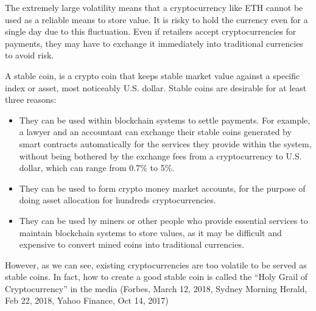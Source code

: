 \documentclass[draft, noinfoline]{ectaart}
\numberwithin{equation}{section}
\theoremstyle{plain}
\begin{document}
The extremely large volatility means that a cryptocurrency like ETH cannot be used as a reliable means to store value. It is risky to hold the currency even for a single day due to this fluctuation. Even if retailers accept cryptocurrencies for payments, they may have to exchange it immediately into traditional currencies to avoid risk.



A stable coin, is a crypto coin that keeps stable market value against a specific index or asset, most noticeably U.S. dollar. Stable coins are desirable for at least three reasons:
\begin{itemize}
\item They can be used within blockchain systems to settle payments. For example, a lawyer and an accountant can exchange their stable coins generated by smart contracts automatically for the services they provide within the system, without being bothered by the exchange fees from a cryptocurrency to U.S. dollar, which can range from 0.7\% to 5\%.
\item  They can be used to form crypto money market accounts, for the purpose of doing asset allocation for hundreds cryptocurrencies.
\item They can be used by miners or other people who provide essential services to maintain blockchain systems to store values, as it may be difficult and expensive to convert mined coins into traditional currencies.
\end{itemize}
However, as we can see, existing cryptocurrencies are too volatile to be served as stable coins.
In fact, how to create a good stable coin is called the ``Holy Grail of Cryptocurrency'' in the media (Forbes, March 12, 2018,
Sydney Morning Herald, Feb 22, 2018, Yahoo Finance, Oct 14, 2017)
\end{document}
